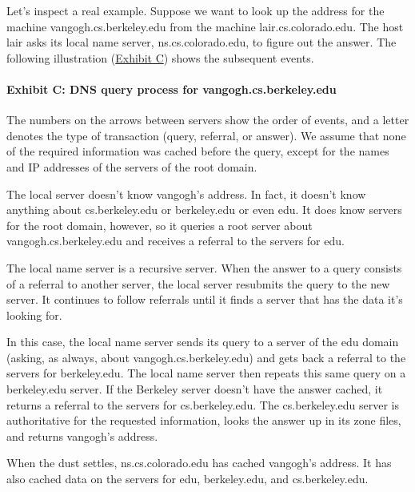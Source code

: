 Let's inspect a real example. Suppose we want to look up the address for
the machine vangogh.cs.berkeley.edu from the machine
lair.cs.colorado.edu. The host lair asks its local name server,
ns.cs.colorado.edu, to figure out the answer. The following illustration
(\protect\hyperlink{part0024_split_015.htmlux5cux23_idTextAnchor860}{Exhibit
C}) shows the subsequent events.

\paragraph[{Exhibit C: }DNS query process for
vangogh.cs.berkeley.edu]{\texorpdfstring{{Exhibit C:
}\protect\hypertarget{part0024_split_015.htmlux5cux23_idTextAnchor860}{}{}DNS
query process for
vangogh.cs.berkeley.edu}{Exhibit C: DNS query process for vangogh.cs.berkeley.edu}}


The numbers on the arrows between servers show the order of events, and
a letter denotes the type of transaction (query, referral, or answer).
We assume that none of the required information was cached before the
query, except for the names and IP addresses of the servers of the root
domain.

The local server doesn't know vangogh's address. In fact, it doesn't
know anything about cs.berkeley.edu or berkeley.edu or even edu. It does
know servers for the root domain, however, so it queries a root server
about vangogh.cs.berkeley.edu and receives a referral to the servers for
edu.

The local name server is a recursive server. When the answer to a query
consists of a referral to another server, the local server resubmits the
query to the new server. It continues to follow referrals until it finds
a server that has the data it's looking for.

In this case, the local name server sends its query to a server of the
edu domain (asking, as always, about vangogh.cs.berkeley.edu) and gets
back a referral to the servers for berkeley.edu. The local name server
then repeats this same query on a berkeley.edu server. If the Berkeley
server doesn't have the answer cached, it returns a referral to the
servers for cs.berkeley.edu. The cs.berkeley.edu server is authoritative
for the requested information, looks the answer up in its zone files,
and returns vangogh's address.

When the dust settles, ns.cs.colorado.edu has cached vangogh's address.
It has also cached data on the servers for edu, berkeley.edu, and
cs.berkeley.edu.

